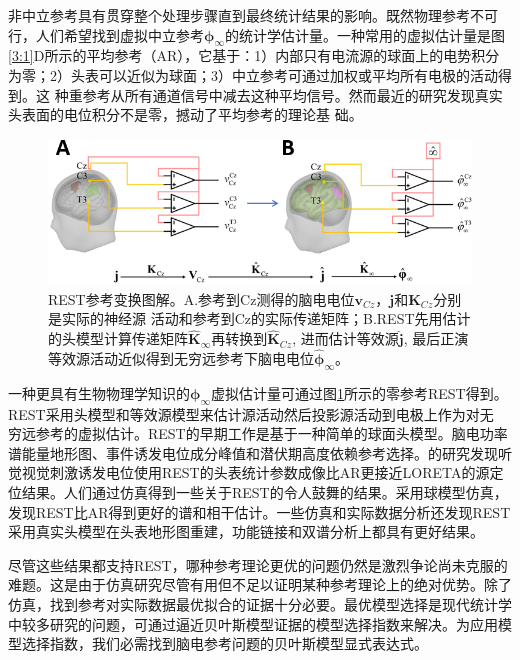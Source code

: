 非中立参考具有贯穿整个处理步骤直到最终统计结果的影响。既然物理参考不可行，人们希望找到虚拟中立参考$\mathbf{\phi}_{\infty}$的统计学估计量。一种常用的虚拟估计量是图\ref{3:1}D所示的平均参考（AR），它基于：1）内部只有电流源的球面上的电势积分为零；2）头表可以近似为球面；3）中立参考可通过加权或平均所有电极的活动得到。这
种重参考从所有通道信号中减去这种平均信号。然而最近的研究发现真实头表面的电位积分不是零，撼动了平均参考的理论基
础。
\begin{figure}[!h]
	\centering
	\includegraphics[width=15cm]{pic/Frontier/figure2.png}
	\caption{REST参考变换图解。A.参考到Cz测得的脑电电位$\mathbf{v}_{Cz}$，$\mathbf{j}$和$\mathbf{K}_{Cz}$分别是实际的神经源
	活动和参考到Cz的实际传递矩阵；B.REST先用估计的头模型计算传递矩阵$\hat{\mathbf{K}}_\infty$再转换到$\hat{\mathbf{K}}_{Cz}$, 进而估计等效源$\hat{\mathbf{j}}$, 最后正演等效源活动近似得到无穷远参考下脑电电位$\hat{\mathbf{\phi}}_\infty$。}
	\label{3:2}
\end{figure}
一种更具有生物物理学知识的$\mathbf{\phi}_{\infty}$虚拟估计量可通过图\ref{3:2}所示的零参考REST得到。REST采用头模型和等效源模型来估计源活动然后投影源活动到电极上作为对无
穷远参考的虚拟估计。REST的早期工作是基于一种简单的球面头模型。脑电功率谱能量地形图、事件诱发电位成分峰值和潜伏期高度依赖参考选择。\cite{tian_why_2013}的研究发现听觉视觉刺激诱发电位使用REST的头表统计参数成像比AR更接近LORETA的源定位结果。人们通过仿真得到一些关于REST的令人鼓舞的结果。采用球模型仿真，\cite{marzetti_l_use_2007,qin_comparative_2010}发现REST比AR得到更好的谱和相干估计。一些仿真和实际数据分析还发现REST采用真实头模型在头表地形图重建，功能链接和双谱分析上都具有更好结果。

尽管这些结果都支持REST，哪种参考理论更优的问题仍然是激烈争论尚未克服的难题。这是由于仿真研究尽管有用但不足以证明某种参考理论上的绝对优势。除了仿真，找到参考对实际数据最优拟合的证据十分必要。最优模型选择是现代统计学中较多研究的问题，可通过逼近贝叶斯模型证据的模型选择指数来解决。为应用模型选择指数，我们必需找到脑电参考问题的贝叶斯模型显式表达式。

